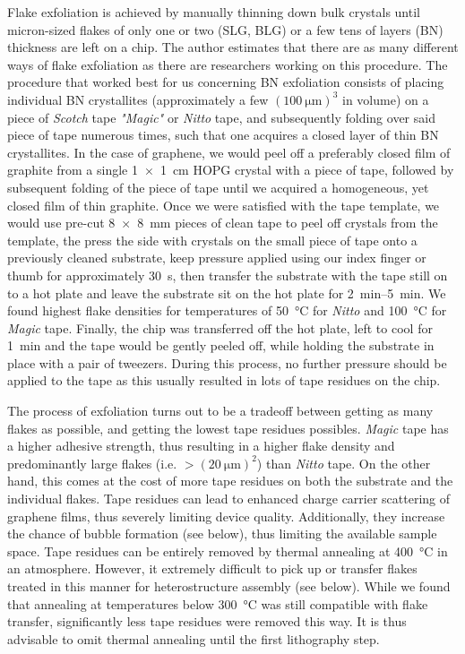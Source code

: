 Flake exfoliation is achieved by manually thinning down bulk crystals until micron-sized flakes of only one or two (SLG, BLG) or a few tens of layers (BN) thickness are left on a chip.
% 
The author estimates that there are as many different ways of flake exfoliation as there are researchers working on this procedure.
% 
The procedure that worked best for us concerning BN exfoliation consists of placing individual BN crystallites (approximately a few $(\SI{100}{\micro\meter})^3$ in volume) on a piece of \textit{Scotch} tape \textit{"Magic"} or \textit{Nitto} tape, and subsequently folding over said piece of tape numerous times, such that one acquires a closed layer of thin BN crystallites.
% 
In the case of graphene, we would peel off a preferably closed film of graphite from a single \SI{1x1}{\centi\meter} HOPG crystal with a piece of tape, followed by subsequent folding of the piece of tape until we acquired a homogeneous, yet closed film of thin graphite.
% 
Once we were satisfied with the tape template, we would use pre-cut \SI{8x8}{\milli\meter} pieces of clean tape to peel off crystals from the template, the press the side with crystals on the small piece of tape onto a previously cleaned substrate, keep pressure applied using our index finger or thumb for approximately \SI{30}{\second}, then transfer the substrate with the tape still on to a hot plate and leave the substrate sit on the hot plate for \SIrange{2}{5}{\minute}.
% 
We found highest flake densities for temperatures of \SI{50}{\celsius} for \textit{Nitto} and \SI{100}{\celsius} for \textit{Magic} tape.
% 
Finally, the chip was transferred off the hot plate, left to cool for \SI{1}{\minute} and the tape would be gently peeled off, while holding the substrate in place with a pair of tweezers.
% 
During this process, no further pressure should be applied to the tape as this usually resulted in lots of tape residues on the chip.


The process of exfoliation turns out to be a tradeoff between getting as many flakes as possible, and getting the lowest tape residues possibles.
% 
\textit{Magic} tape has a higher adhesive strength, thus resulting in a higher flake density and predominantly large flakes (i.e. $>(\SI{20}{\micro\meter})^2$) than \textit{Nitto} tape.
% 
On the other hand, this comes at the cost of more tape residues on both the substrate and the individual flakes.
% 
Tape residues can lead to enhanced charge carrier scattering of graphene films, thus severely limiting device quality.
% 
Additionally, they increase the chance of bubble formation (see below), thus limiting the available sample space.
% 
Tape residues can be entirely removed by thermal annealing at \SI{400}{\celsius} in  an  atmosphere.
% 
However, it extremely difficult to pick up or transfer flakes treated in this manner for heterostructure assembly (see below).
% 
While we found that annealing at temperatures below \SI{300}{\celsius} was still compatible with flake transfer, significantly less tape residues were removed this way.
% 
It is thus advisable to omit thermal annealing until the first lithography step.

